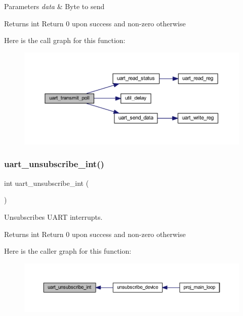 \begin{DoxyParams}{Parameters}
{\em data} & Byte to send \\
\hline
\end{DoxyParams}
\begin{DoxyReturn}{Returns}
int Return 0 upon success and non-\/zero otherwise 
\end{DoxyReturn}
Here is the call graph for this function\+:\nopagebreak
\begin{figure}[H]
\begin{center}
\leavevmode
\includegraphics[width=350pt]{group__uart_ga7c1b3c604c178875b108adfbd853f81f_cgraph}
\end{center}
\end{figure}
\mbox{\label{group__uart_gaf1ff3ad84fc50b3da2bf271b569af0da}} 
\subsubsection{\texorpdfstring{uart\+\_\+unsubscribe\+\_\+int()}{uart\_unsubscribe\_int()}}
{\footnotesize\ttfamily int uart\+\_\+unsubscribe\+\_\+int (\begin{DoxyParamCaption}{ }\end{DoxyParamCaption})}



Unsubscribes U\+A\+RT interrupts. 

\begin{DoxyReturn}{Returns}
int Return 0 upon success and non-\/zero otherwise 
\end{DoxyReturn}
Here is the caller graph for this function\+:\nopagebreak
\begin{figure}[H]
\begin{center}
\leavevmode
\includegraphics[width=350pt]{group__uart_gaf1ff3ad84fc50b3da2bf271b569af0da_icgraph}
\end{center}
\end{figure}
\mbox{\label{group__uart_ga59c922bd359845f14061ced67e74c6b3}} 
